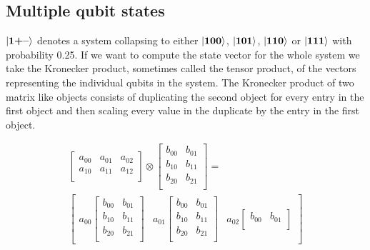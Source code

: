 \subsection{Multiple qubit states}
$\ket{\mathbf{1}\textbf{+}\textbf{--}}$ denotes a system collapsing to either $\ket{\mathbf{1}\mathbf{0}\mathbf{0}}$, $\ket{\mathbf{1}\mathbf{0}\mathbf{1}}$, $\ket{\mathbf{1}\mathbf{1}\mathbf{0}}$ or $\ket{\mathbf{1}\mathbf{1}\mathbf{1}}$ with probability 0.25. 
If we want to compute the state vector for the whole system we take the Kronecker product\cite{kronecker_product}, sometimes called the tensor product, of the vectors representing the individual qubits in the system. 
The Kronecker product of two matrix like objects consists of duplicating the second object for every entry in the first object and then scaling every value in the duplicate by the entry in the first object.
\begin{figure}[H]
    \centering
    \begin{gather*}
        \begin{bmatrix}
            a_{00} & a_{01} & a_{02} \\
            a_{10} & a_{11} & a_{12} \\
        \end{bmatrix}
        \otimes
        \begin{bmatrix}
            b_{00} & b_{01} \\
            b_{10} & b_{11} \\
            b_{20} & b_{21} \\
        \end{bmatrix}
        = \\
        \begin{bmatrix}
            a_{00}
            \begin{bmatrix}
                b_{00} & b_{01} \\
                b_{10} & b_{11} \\
                b_{20} & b_{21} \\
            \end{bmatrix} 
            & a_{01}
            \begin{bmatrix}
                b_{00} & b_{01} \\
                b_{10} & b_{11} \\
                b_{20} & b_{21} \\
            \end{bmatrix} 
            & a_{02}
            \begin{bmatrix}
                b_{00} & b_{01} \\

\end{bmatrix}
\end{bmatrix}
\end{gather*}
\end{figure}
